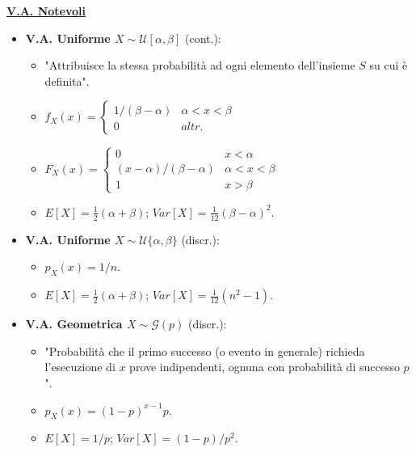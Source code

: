 \documentclass[8pt]{extarticle}
\begin{document}
\begin{multicols*}{3}
    \textbf{\underline{V.A. Notevoli}}
    \begin{itemize}
        \item \textbf{V.A. Uniforme $X\sim\mathcal{U}[\alpha, \beta]$} (cont.):
              \begin{itemize}
                  \item "Attribuisce la stessa probabilità ad ogni elemento dell'insieme $S$ su cui è definita".
                  \item $f_{X}(x)=\begin{cases}
                                1/(\beta-\alpha) & \alpha<x<\beta \\
                                0                & altr.
                            \end{cases}$
                  \item $F_{X}(x)=\begin{cases}
                                0                         & x<\alpha       \\
                                (x-\alpha)/(\beta-\alpha) & \alpha<x<\beta \\
                                1                         & x>\beta
                            \end{cases}$
                  \item $E[X]=\frac{1}{2}(\alpha +\beta)$; $Var[X]=\frac{1}{12}(\beta -\alpha)^{2}$.
              \end{itemize}
        \item \textbf{V.A. Uniforme $X\sim\mathcal{U}\{\alpha, \beta\}$} (discr.):
              \begin{itemize}
                  \item $p_{X}(x)=1/n$.
                  \item $E[X]=\frac{1}{2}(\alpha +\beta)$; $Var[X]=\frac{1}{12}(n^{2}-1)$.
              \end{itemize}
        \item \textbf{V.A. Geometrica $X\sim\mathcal{G}(p)$} (discr.):
              \begin{itemize}
                  \item "Probabilità che il primo successo (o evento in generale) richieda l'esecuzione di $x$ prove indipendenti, ognuna con probabilità di successo $p$".
                  \item $p_{X}(x)=(1-p)^{x-1}p$.
                  \item $E[X]=1/p$; $Var[X]=(1-p)/p^{2}$.
              \end{itemize}

\end{itemize}
\end{multicols*}
\end{document}
